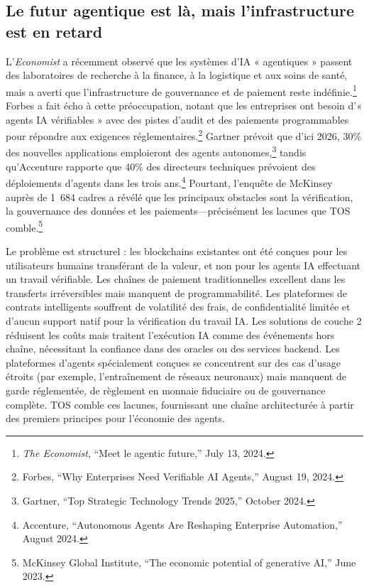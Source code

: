 \documentclass[11pt]{article}
\begin{document}
\subsection{Le futur agentique est là, mais l'infrastructure est en retard}
L'\emph{Economist} a récemment observé que les systèmes d'IA « agentiques » passent des laboratoires de recherche à la finance, à la logistique et aux soins de santé, mais a averti que l'infrastructure de gouvernance et de paiement reste indéfinie.\footnote{\emph{The Economist}, ``Meet le agentic future,'' July 13, 2024.} Forbes a fait écho à cette préoccupation, notant que les entreprises ont besoin d'« agents IA vérifiables » avec des pistes d'audit et des paiements programmables pour répondre aux exigences réglementaires.\footnote{Forbes, ``Why Enterprises Need Verifiable AI Agents,'' August 19, 2024.} Gartner prévoit que d'ici 2026, 30\% des nouvelles applications emploieront des agents autonomes,\footnote{Gartner, ``Top Strategic Technology Trends 2025,'' October 2024.} tandis qu'Accenture rapporte que 40\% des directeurs techniques prévoient des déploiements d'agents dans les trois ans.\footnote{Accenture, ``Autonomous Agents Are Reshaping Enterprise Automation,'' August 2024.} Pourtant, l'enquête de McKinsey auprès de 1~684 cadres a révélé que les principaux obstacles sont la vérification, la gouvernance des données et les paiements---précisément les lacunes que TOS comble.\footnote{McKinsey Global Institute, ``The economic potential of generative AI,'' June 2023.}

Le problème est structurel : les blockchains existantes ont été conçues pour les utilisateurs humains transférant de la valeur, et non pour les agents IA effectuant un travail vérifiable. Les chaînes de paiement traditionnelles excellent dans les transferts irréversibles mais manquent de programmabilité. Les plateformes de contrats intelligents souffrent de volatilité des frais, de confidentialité limitée et d'aucun support natif pour la vérification du travail IA. Les solutions de couche 2 réduisent les coûts mais traitent l'exécution IA comme des événements hors chaîne, nécessitant la confiance dans des oracles ou des services backend. Les plateformes d'agents spécialement conçues se concentrent sur des cas d'usage étroits (par exemple, l'entraînement de réseaux neuronaux) mais manquent de garde réglementée, de règlement en monnaie fiduciaire ou de gouvernance complète. TOS comble ces lacunes, fournissant une chaîne architecturée à partir des premiers principes pour l'économie des agents.
\end{document}
